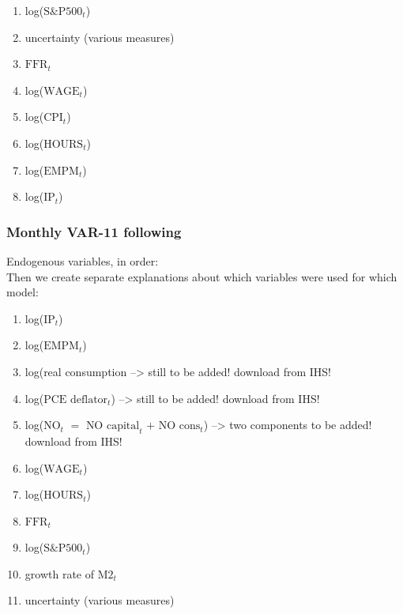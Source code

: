 \documentclass[a4paper,11pt,listof=nochaptergap,oneside,pointednumbers,bibtotoc,bigheadings,liststotoc]{scrbook}
\theoremstyle{mysatz}
\theoremstyle{mydefinition}
\theoremstyle{mybemerkung}
\renewcommand*{\paragraph}[1]{\subsubsection*{#1} \vspace{-3mm}} %
\begin{document}
\begin{itemize}
\begingroup
\begin{spacing}{0.5}
    \fontsize{10pt}{12pt}\selectfont
\begin{enumerate}
	\item log($\text{S\&P500}_t$)
	\item uncertainty (various measures)
	\item $\text{FFR}_t$
	\item log($\text{WAGE}_t$)
	\item log($\text{CPI}_t$)
	\item log($\text{HOURS}_t$)
	\item log($\text{EMPM}_t$)	
	\item log($\text{IP}_t$)		
\end{enumerate}
\end{spacing}
\endgroup



\paragraph{Monthly VAR-11 following \citet{juradoetal:15}} Endogenous variables, in order:\\
Then we create separate explanations about which variables were used for which model:\\

\begingroup
\begin{spacing}{0.5}
    \fontsize{10pt}{12pt}\selectfont
\begin{enumerate}
	\item log($\text{IP}_t$)
	\item log($\text{EMPM}_t$)
	\item log(real consumption --> still to be added! download from IHS!
	\item log($\text{PCE deflator}_t$) --> still to be added! download from IHS!
	\item log($\text{NO}_t$ $=$ $\text{NO capital}_t$ $+$ $\text{NO cons}_t$) --> two components to be added! download from IHS!
	\item log($\text{WAGE}_t$)
	\item log($\text{HOURS}_t$)
	\item $\text{FFR}_t$
	\item log($\text{S\&P500}_t$)
	\item growth rate of $\text{M2}_t$
	\item uncertainty (various measures)
\end{enumerate}
\end{spacing}
\endgroup



\end{itemize}
\end{document}
